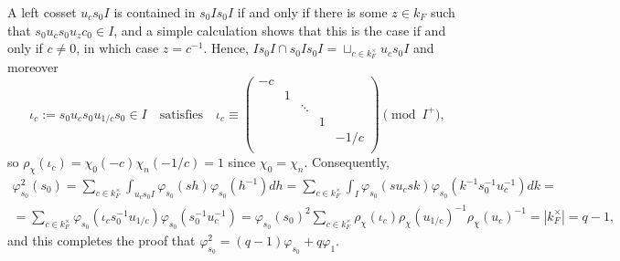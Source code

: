     A left cosset $u_cs_0I$ is contained in $s_0Is_0I$ if and only if there is some $z\in k_F$ such that $s_0u_cs_0u_zc_0\in I$, and a simple calculation shows that this is the case if and only if $c\neq 0$, in which case $z=c^{-1}$. Hence, $Is_0I\cap s_0Is_0I=\sqcup_{c\in k_F^\times}u_cs_0I$ and moreover 
    $$\iota_c:=s_0u_cs_0u_{1/c}s_0\in I\quad\text{satisfies}\quad\iota_c\equiv\begin{pmatrix}
        -c &&&& \\
        & 1 &&& \\
        && \ddots && \\
        &&& 1 & \\
        &&&& -1/c \\
    \end{pmatrix}\pmod{I^+},$$
    so $\rho_\chi(\iota_c)=\chi_0(-c)\chi_n(-1/c)=1$ since $\chi_0=\chi_n$. Consequently, 
    \begin{align*}
        \varphi_{s_0}^2(s_0)=\sum_{c\in k_F^\times}\int_{u_cs_0I}\varphi_{s_0}(sh)\varphi_{s_0}(h^{-1})dh=\sum_{c\in k_F^\times}\int_{I}\varphi_{s_0}(su_csk)\varphi_{s_0}(k^{-1}s_0^{-1}u_c^{-1})dk=\\
        =\sum_{c\in k_F^\times}\varphi_{s_0}(\iota_cs_0^{-1}u_{1/c})\varphi_{s_0}(s_0^{-1}u_c^{-1})=\varphi_{s_0}(s_0)^2\sum_{c\in k_F^\times}\rho_\chi(\iota_c)\rho_\chi(u_{1/c})^{-1}\rho_\chi(u_c)^{-1}=|k_F^\times|=q-1,
    \end{align*}
    and this completes the proof that $\varphi_{s_0}^2=(q-1)\varphi_{s_0}+q\varphi_1$.
    
